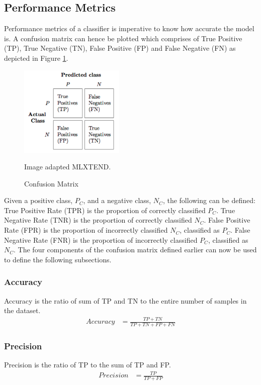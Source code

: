 \documentclass[a4paper,12pt,twoside]{report}
\begin{document}
\subsection{Performance Metrics}
Performance metrics of a classifier is imperative to know how accurate the model is. A confusion matrix can hence be plotted which comprises of True Positive (TP), True Negative (TN), False Positive (FP) and False Negative (FN) as depicted in Figure \ref{fig:confusion-matrix}.
\begin{figure}[h] %
    \centering
    \includegraphics[width=5cm]{confusion_matrix}
    \caption{Confusion Matrix}
    \small Image adapted MLXTEND\footnotemark.
    \label{fig:confusion-matrix}
\end{figure}
\newline \newline
Given a positive class, $P_C$, and a negative class, $N_C$, the following can be defined:
\newline \newline
True Positive Rate (TPR) is the proportion of correctly classified $P_C$. True Negative Rate (TNR) is the proportion of correctly classified $N_C$. False Positive Rate (FPR) is the proportion of incorrectly classified $N_C$, classified as $P_C$. False Negative Rate (FNR) is the proportion of incorrectly classified $P_C$, classified as $N_C$. The four components of the confusion matrix defined earlier can now be used to define the following subsections.

\subsubsection{Accuracy} 
Accuracy is the ratio of sum of TP and TN to the entire number of samples in the dataset.
\begin{align*}
Accuracy &= \frac{ TP + TN}{TP + TN + FP + FN}
\end{align*}

\subsubsection{Precision} 
Precision is the ratio of TP to the sum of TP and FP.
\begin{align*}
Precision &= \frac{TP}{TP + FP}
\end{align*}
\end{document}
